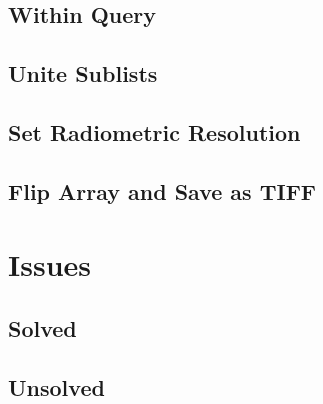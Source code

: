 \documentclass[10pt, a4paper]{article}
\begin{document}
\subsection{Within Query}

\subsection{Unite Sublists}
\subsection{Set Radiometric Resolution}
\subsection{Flip Array and Save as TIFF}

\section{Issues}
\subsection{Solved}
\subsection{Unsolved}




\begin{figure}[!htbp]
	\centering
\end{figure}
\end{document}
